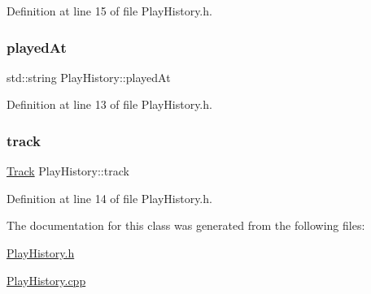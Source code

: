 Definition at line 15 of file Play\+History.\+h.

\mbox{\label{class_play_history_a4ba2ba8a6851df5c1cae76b9ca8bc672}} 
\subsubsection{\texorpdfstring{played\+At}{playedAt}}
{\footnotesize\ttfamily std\+::string Play\+History\+::played\+At\hspace{0.3cm}{\ttfamily [private]}}



Definition at line 13 of file Play\+History.\+h.

\mbox{\label{class_play_history_a4e28e27155a1138c083bf58303f1c959}} 
\subsubsection{\texorpdfstring{track}{track}}
{\footnotesize\ttfamily \mbox{\hyperlink{class_track}{Track}} Play\+History\+::track\hspace{0.3cm}{\ttfamily [private]}}



Definition at line 14 of file Play\+History.\+h.



The documentation for this class was generated from the following files\+:\begin{DoxyCompactItemize}
\item 
\mbox{\hyperlink{_play_history_8h}{Play\+History.\+h}}\item 
\mbox{\hyperlink{_play_history_8cpp}{Play\+History.\+cpp}}\end{DoxyCompactItemize}
